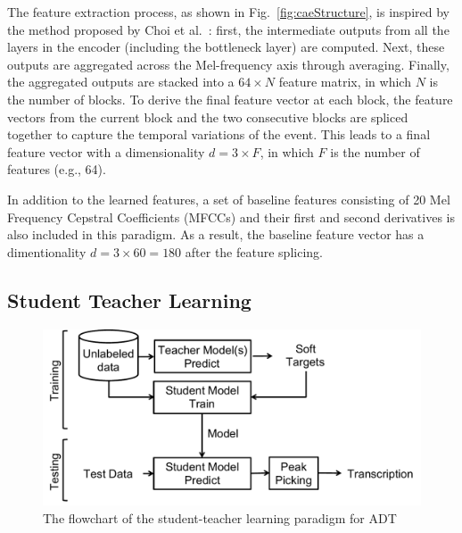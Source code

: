 \documentclass{article}
\begin{document}
The feature extraction process, as shown in Fig.~\ref{fig:caeStructure}, is inspired by the method proposed by Choi et al.~\cite{Choi2017a}: first, the intermediate outputs from all the layers in the encoder (including the bottleneck layer) are computed. Next, these outputs are aggregated across the Mel-frequency axis through averaging. Finally, the aggregated outputs are stacked into a $64 \times N$ feature matrix, in which $N$ is the number of blocks.
To derive the final feature vector at each block, the feature vectors from the current block and the two consecutive blocks are spliced together to capture the temporal variations of the event. This leads to a final feature vector with a dimensionality $d = 3 \times F$, in which $F$ is the number of features (e.g., 64). 

In addition to the learned features, a set of baseline features consisting of 20 Mel Frequency Cepstral Coefficients (MFCCs) and their first and second derivatives is also included in this paradigm. As a result, the baseline feature vector has a dimentionality $d = 3 \times 60 = 180$ after the feature splicing. 

\subsection{Student Teacher Learning}
\label{subsec:studentTeacher}

\begin{figure}
\centering
\includegraphics[width = \columnwidth]{./figs/studentTeacherSys.pdf}
\caption{The flowchart of the student-teacher learning paradigm for ADT}
\label{fig:studentTeacherFlow}
\end{figure}
\end{document}
